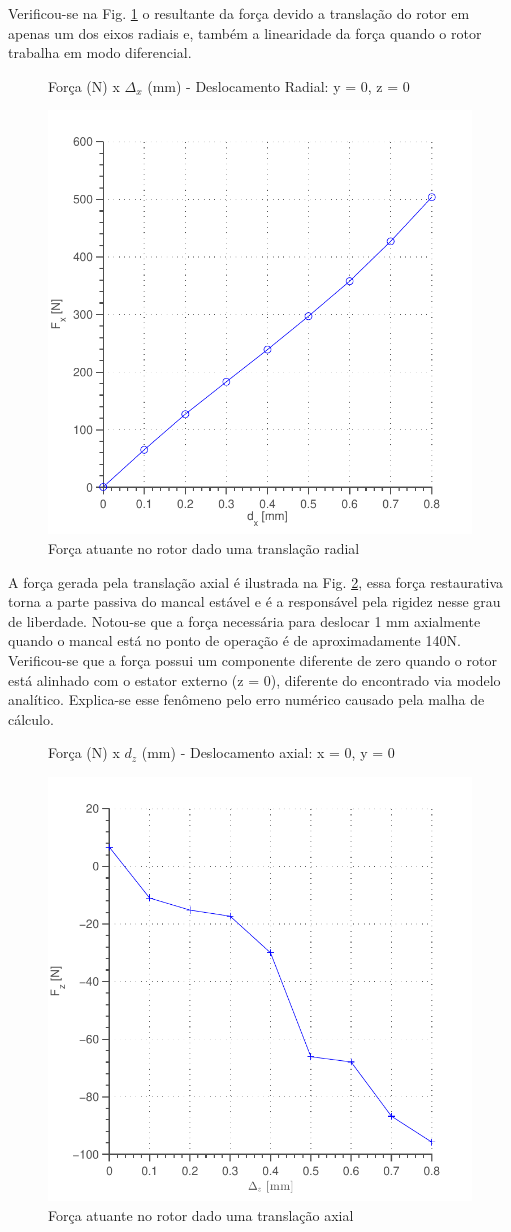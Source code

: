 Verificou-se na Fig. \ref{fig:forca:passivo:otimizado:fem:dx} o resultante  da força devido a translação do rotor em apenas um dos eixos radiais e, também a linearidade da força quando o rotor trabalha em modo diferencial.  

\begin{figure}[!ht]
\centering
\caption*{Força (N) x $\Delta_x$ (mm) - Deslocamento Radial: y = 0, z = 0}
\includegraphics[width=0.6 \columnwidth,angle=0]{Figs/Simulacoes/Passivo2/fem/passivo_otimizado_fem_dx}
\caption{Força atuante no rotor dado uma translação radial}
\label{fig:forca:passivo:otimizado:fem:dx}
\end{figure} 

A força gerada pela translação axial é ilustrada na Fig. \ref{fig:forca:passivo:otimizado:fem:dy}, essa força restaurativa torna a parte passiva do mancal estável e é a responsável pela rigidez nesse grau de liberdade. Notou-se que a força necessária para deslocar 1 mm axialmente quando o mancal está no ponto de operação é de aproximadamente 140N. Verificou-se que a força possui um componente diferente de zero quando o rotor está alinhado com o estator externo (z = 0), diferente do encontrado via  modelo analítico. Explica-se esse fenômeno pelo erro numérico causado pela malha de cálculo.

\begin{figure}[!ht]
	\centering
	\caption*{Força (N) x $d_z$ (mm) - Deslocamento axial: x = 0, y = 0}
	\includegraphics[width=0.6 \columnwidth,angle=0]{Figs/Simulacoes/Passivo2/fem/passivo_otimizado_fem_dy}
	\caption{Força atuante no rotor dado uma translação axial}
	\label{fig:forca:passivo:otimizado:fem:dy}
\end{figure}

